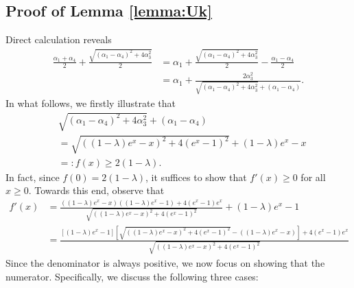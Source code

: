 \subsection{Proof of Lemma \ref{lemma:Uk}}\label{app:proof-lemma-Uk}
Direct calculation reveals
\begin{align}\label{eq:lemma-Uk-1}
\frac{\alpha_1 + \alpha_4}{2} + \frac{\sqrt{(\alpha_1 - \alpha_4)^2 + 4\alpha_3^2}}{2} \nonumber &= \alpha_1 + \frac{\sqrt{(\alpha_1 - \alpha_4)^2 + 4\alpha_3^2}}{2} - \frac{\alpha_1 -\alpha_4}{2} \nonumber \\ 
&= \alpha_1 + \frac{2\alpha_3^2}{\sqrt{(\alpha_1 - \alpha_4)^2 + 4\alpha_3^2} + (\alpha_1 -\alpha_4)}.
\end{align}
In what follows, we firstly illustrate that
\begin{align}\label{eq:lemma-Uk-2}
&\sqrt{(\alpha_1 - \alpha_4)^2 + 4\alpha_3^2} + (\alpha_1 -\alpha_4) \nonumber \\ 
&=\sqrt{((1-\lambda)e^x - x)^2 + 4(e^x-1)^2} + (1-\lambda)e^x - x\nonumber \\ 
&=: f(x) \geq 2(1-\lambda).
\end{align}
In fact, since $f(0) = 2(1-\lambda)$, it suffices to show that $f'(x) \geq 0$ for all $x \geq 0$. Towards this end, observe that
\begin{align*}
f'(x) &= \frac{((1-\lambda)e^x - x) ((1-\lambda) e^x-1) + 4(e^x-1)e^x}{\sqrt{((1-\lambda)e^x - x)^2 + 4(e^x-1)^2}} + (1-\lambda) e^x-1 \\ 
&= \frac{[(1-\lambda)e^x-1]\left[\sqrt{((1-\lambda)e^x - x)^2 + 4(e^x-1)^2} - ((1-\lambda)e^x - x)\right] + 4(e^x-1)e^x}{\sqrt{((1-\lambda)e^x - x)^2 + 4(e^x-1)^2}}
\end{align*}
Since the denominator is always positive, we now focus on showing that the numerator. Specifically, we discuss the following three cases:
